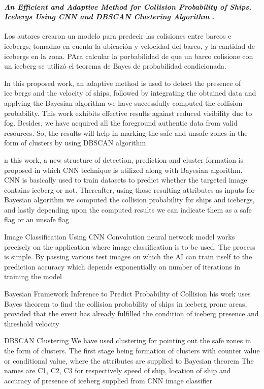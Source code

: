 \paragraph{
    \textbf{\emph{An Efficient and Adaptive Method for Collision
    Probability of Ships, Icebergs Using CNN
    and DBSCAN Clustering Algorithm}
    }
    \cite[pág. 20]{somani_emerging_2019}.
}

Los autores crearon un modelo para predecir las colisiones entre barcos e icebergs, 
tomadno en cuenta la ubicación y velocidad del barco, y la cantidad de icebergs en la zona.
PAra calcular la porbabilidad de que un barco colisione con un iceberg 
se utilizó el teorema de Bayes de probabilidad condicionada.

In this proposed work, an adaptive method is used to detect the presence of icebergs and the velocity of ships, followed by integrating the obtained data and
applying the Bayesian algorithm we have successfully computed the collision
probability. This work exhibits effective results against reduced visibility due to
fog. Besides, we have acquired all the foreground authentic data from valid
resources. So, the results will help in marking the safe and unsafe zones in the
form of clusters by using DBSCAN algorithm


n this work, a new structure of detection, prediction and cluster formation is
proposed in which CNN technique is utilized along with Bayesian algorithm. CNN is
basically used to train datasets to predict whether the targeted image contains iceberg or
not. Thereafter, using those resulting attributes as inputs for Bayesian algorithm we
computed the collision probability for ships and icebergs, and lastly depending upon
the computed results we can indicate them as a safe flag or an unsafe flag

Image Classification Using CNN
Convolution neural network model works precisely on the application where image
classification is to be used. The process is simple. By passing various test images on
which the AI can train itself to the prediction accuracy which depends exponentially on
number of iterations in training the model


Bayesian Framework Inference to Predict Probability of Collision
his work uses Bayes theorem to find the collision probability of ships in iceberg prone
areas, provided that the event has already fulfilled the condition of iceberg presence and
threshold velocity


DBSCAN Clustering
We have used clustering for pointing out the safe zones in the form of clusters. The first
stage being formation of clusters with counter value or conditional value, where the
attributes are supplied to Bayesian theorem
The names are C1, C2, C3 for respectively
speed of ship, location of ship and accuracy of presence of iceberg supplied from CNN
image classifier



